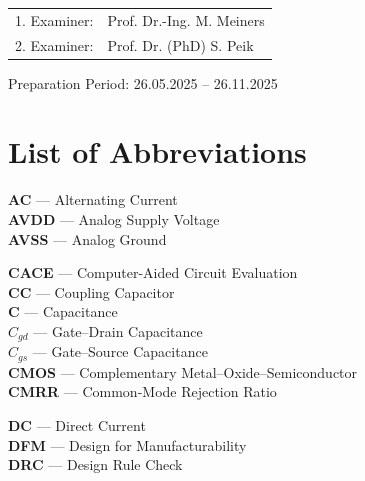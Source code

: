 \documentclass[
  11pt,
  a4paper,
  oneside]{scrbook}
\renewcommand*\contentsname{Table of contents}
\newcommand\contentsname{Table of contents}
\begin{document}
\begin{titlepage}
\begin{center}
\vspace{1cm}

\begin{tabular}{rl}
1. Examiner: & Prof. Dr.-Ing. M. Meiners \\
2. Examiner: & Prof. Dr. (PhD) S. Peik \\
\end{tabular}

\vspace{1cm}

{\large Preparation Period: 26.05.2025 -- 26.11.2025}

\end{center}
\end{titlepage}


\renewcommand*\contentsname{Table of contents}
{
\hypersetup{linkcolor=}
\setcounter{tocdepth}{2}
\tableofcontents
}
\listoffigures
\listoftables

\mainmatter
{}

\chapter*{List of Abbreviations}\label{list-of-abbreviations}


\textbf{AC} --- Alternating Current\\
\textbf{AVDD} --- Analog Supply Voltage\\
\textbf{AVSS} --- Analog Ground

\textbf{CACE} --- Computer-Aided Circuit Evaluation\\
\textbf{CC} --- Coupling Capacitor\\
\textbf{C} --- Capacitance\\
\textbf{\(C_{gd}\)} --- Gate--Drain Capacitance\\
\textbf{\(C_{gs}\)} --- Gate--Source Capacitance\\
\textbf{CMOS} --- Complementary Metal--Oxide--Semiconductor\\
\textbf{CMRR} --- Common-Mode Rejection Ratio

\textbf{DC} --- Direct Current\\
\textbf{DFM} --- Design for Manufacturability\\
\textbf{DRC} --- Design Rule Check
\end{document}
